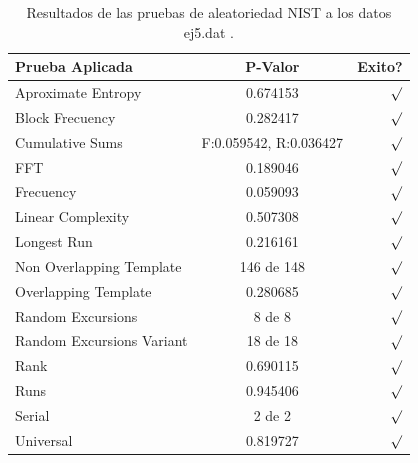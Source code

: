 \documentclass[10pt]{IEEEtran}
\begin{document}
\begin{table}[H]
\caption{Resultados de las pruebas de aleatoriedad NIST a los datos ej5.dat .}
\label{caso1}
\begin{center}
\begin{small}
\begin{tabular}{|l|c|r|}
\hline

Prueba Aplicada &  P-Valor & Exito? \\
\hline

Aproximate Entropy    &    0.674153  & $\surd$ \\

Block Frecuency  &  0.282417  &  $\surd$  \\

Cumulative Sums    &   F:0.059542, R:0.036427 & $\surd$ \\

FFT    &   0.189046   &  $\surd$     \\

Frecuency     &  0.059093  &  $\surd$   \\

Linear Complexity      & 0.507308 & $\surd$ \\

Longest Run      &   0.216161  &    $\surd$      \\

Non Overlapping Template      & 146 de 148    &     $\surd$          \\

Overlapping Template      &   0.280685   &      $\surd$      \\

Random Excursions      & 8 de 8  &    $\surd$      \\

Random Excursions Variant & 18 de 18 &     $\surd$    \\

Rank & 0.690115  &      $\surd$      \\

Runs &   0.945406  &     $\surd$        \\

Serial &     2 de 2    &     $\surd$        \\

Universal &     0.819727 &   $\surd$            \\

\hline

\end{tabular}
\end{small}
\end{center}
\end{table}
\end{document}
